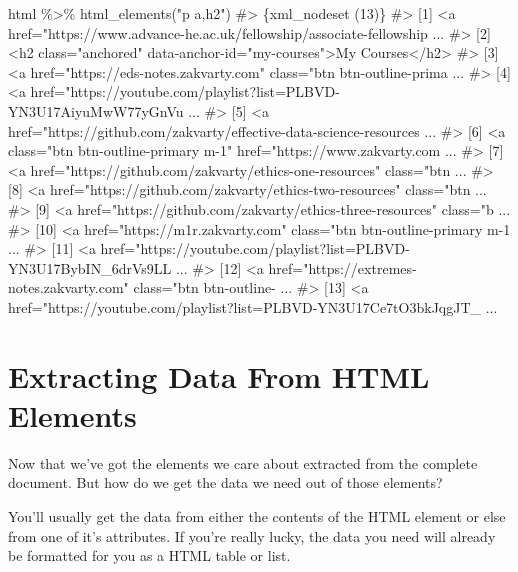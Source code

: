 \documentclass[
  letterpaper,
  DIV=11,
  numbers=noendperiod]{scrreprt}
\newenvironment{Shaded}{\begin{snugshade}}{\end{snugshade}}
\newcommand{\CommentTok}[1]{\textcolor[rgb]{0.37,0.37,0.37}{#1}}
\newcommand{\FunctionTok}[1]{\textcolor[rgb]{0.28,0.35,0.67}{#1}}
\newcommand{\NormalTok}[1]{\textcolor[rgb]{0.00,0.23,0.31}{#1}}
\newcommand{\SpecialCharTok}[1]{\textcolor[rgb]{0.37,0.37,0.37}{#1}}
\newcommand{\StringTok}[1]{\textcolor[rgb]{0.13,0.47,0.30}{#1}}
\begin{document}
\begin{Shaded}
\begin{Highlighting}[]
\NormalTok{html }\SpecialCharTok{\%\textgreater{}\%} \FunctionTok{html\_elements}\NormalTok{(}\StringTok{"p a,h2"}\NormalTok{)}
\CommentTok{\#\textgreater{} \{xml\_nodeset (13)\}}
\CommentTok{\#\textgreater{}  [1] \textless{}a href="https://www.advance{-}he.ac.uk/fellowship/associate{-}fellowship ...}
\CommentTok{\#\textgreater{}  [2] \textless{}h2 class="anchored" data{-}anchor{-}id="my{-}courses"\textgreater{}My Courses\textless{}/h2\textgreater{}}
\CommentTok{\#\textgreater{}  [3] \textless{}a href="https://eds{-}notes.zakvarty.com" class="btn btn{-}outline{-}prima ...}
\CommentTok{\#\textgreater{}  [4] \textless{}a href="https://youtube.com/playlist?list=PLBVD{-}YN3U17AiyuMwW77yGnVu ...}
\CommentTok{\#\textgreater{}  [5] \textless{}a href="https://github.com/zakvarty/effective{-}data{-}science{-}resources ...}
\CommentTok{\#\textgreater{}  [6] \textless{}a class="btn btn{-}outline{-}primary m{-}1" href="https://www.zakvarty.com ...}
\CommentTok{\#\textgreater{}  [7] \textless{}a href="https://github.com/zakvarty/ethics{-}one{-}resources" class="btn ...}
\CommentTok{\#\textgreater{}  [8] \textless{}a href="https://github.com/zakvarty/ethics{-}two{-}resources" class="btn ...}
\CommentTok{\#\textgreater{}  [9] \textless{}a href="https://github.com/zakvarty/ethics{-}three{-}resources" class="b ...}
\CommentTok{\#\textgreater{} [10] \textless{}a href="https://m1r.zakvarty.com" class="btn btn{-}outline{-}primary m{-}1 ...}
\CommentTok{\#\textgreater{} [11] \textless{}a href="https://youtube.com/playlist?list=PLBVD{-}YN3U17BybIN\_6drVs9LL ...}
\CommentTok{\#\textgreater{} [12] \textless{}a href="https://extremes{-}notes.zakvarty.com" class="btn btn{-}outline{-} ...}
\CommentTok{\#\textgreater{} [13] \textless{}a href="https://youtube.com/playlist?list=PLBVD{-}YN3U17Ce7tO3bkJqgJT\_ ...}
\end{Highlighting}
\end{Shaded}

\section{Extracting Data From HTML
Elements}\label{extracting-data-from-html-elements}

Now that we've got the elements we care about extracted from the
complete document. But how do we get the data we need out of those
elements?

You'll usually get the data from either the contents of the HTML element
or else from one of it's attributes. If you're really lucky, the data
you need will already be formatted for you as a HTML table or list.
\end{document}
